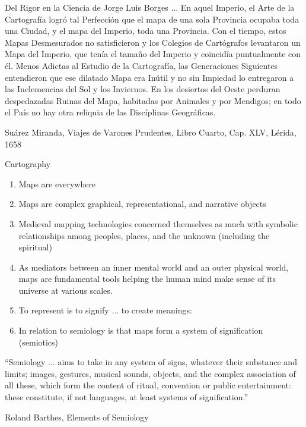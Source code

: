\documentclass{beamer}
\begin{document}
\begin{frame}{Del Rigor en la Ciencia de Jorge Luis Borges}
	... En aquel Imperio, el Arte de la Cartografía logr\'o tal Perfecci\'on que el mapa de una sola
	Provincia ocupaba toda una Ciudad, y el mapa del Imperio, toda una Provincia. Con el
	tiempo, estos Mapas Desmesurados no satisficieron y los Colegios de Cart\'ografos levantaron
	un Mapa del Imperio, que ten\'ia el tama\~no del Imperio y coincid\'ia puntualmente con \'el.
	Menos Adictas al Estudio de la Cartografía, las Generaciones Siguientes entendieron que ese
	dilatado Mapa era In\'util y no sin Impiedad lo entregaron a las Inclemencias del Sol y los
	Inviernos. En los desiertos del Oeste perduran despedazadas Ruinas del Mapa, habitadas por
	Animales y por Mendigos; en todo el Pa\'is no hay otra reliquia de las Disc\'iplinas Geogr\'aficas.\par

	\hfill Su\'arez Miranda, Viajes de Varones Prudentes, Libro Cuarto, Cap. XLV, L\'erida, 1658\par

\end{frame}
\begin{frame}{Cartography}
	\begin{enumerate}
		\item Maps are everywhere
		\item Maps are complex graphical, representational, and narrative objects

		\item Medieval  mapping technologies concerned themselves as much with symbolic relationships among peoples, places, and the unknown (including the spiritual)

		\item As mediators between an inner mental world and an outer physical world, maps are fundamental tools helping the human mind make sense of its universe at various scales.

		\item To represent is to signify ... to create meanings:
		\item In relation to semiology is that maps form a system of signification (semiotics)
	\end{enumerate}
\end{frame}
\begin{frame}
	``Semiology ... aims to take in any system of signs, whatever their substance and limits; images, gestures, musical sounds, objects, and the complex association of all these, which form the content of ritual, convention or public entertainment: these constitute, if not languages, at least systems of signification.''\par
	\hfill Roland Barthes, Elements of Semiology\par
\end{frame}
\end{document}
